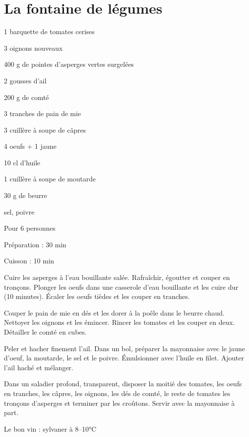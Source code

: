 \section{La fontaine de légumes}

\begin{ingredients}
\item 1 barquette de tomates cerises
\item 3 oignons nouveaux
\item 400 g de pointes d'asperges vertes surgelées
\item 2 gousses d'ail
\item 200 g de comté
\item 3 tranches de pain de mie
\item 3 cuillère à soupe de câpres
\item 4 oeufs + 1 jaune
\item 10 cl d'huile
\item 1 cuillère à soupe de moutarde
\item 30 g de beurre
\item sel, poivre
\end{ingredients}
\begin{infos}
\item Pour 6 personnes		%
\item Préparation : 30 min		%
\item Cuisson : 10 min			%
\end{infos}
\begin{etapes}
\item Cuire les asperges à l'eau bouillante salée. Rafraîchir, égoutter et couper en tronçons. Plonger les oeufs dans une casserole d'eau bouillante et les cuire dur (10 minutes). Écaler les oeufs tièdes et les couper en tranches.
\item Couper le pain de mie en dés et les dorer à la poêle dans le beurre chaud. Nettoyer les oignons et les émincer. Rincer les tomates et les couper en deux. Détailler le comté en cubes.
\item Peler et hacher finement l'ail.
Dans un bol, préparer la mayonnaise avec le jaune d'oeuf, la moutarde, le sel et le poivre. Émulsionner avec l'huile en filet.
Ajouter l'ail haché et mélanger.
\item Dans un saladier profond, transparent, disposer la moitié des tomates, les oeufs en tranches, les câpres, les oignons, les dés de comté, le reste de tomates les tronçons d'asperges et terminer par les croûtons.
Servir avec la mayonnaise à part.
\end{etapes}
\begin{conseils}
Le bon vin : sylvaner à 8--10°C
\end{conseils}
